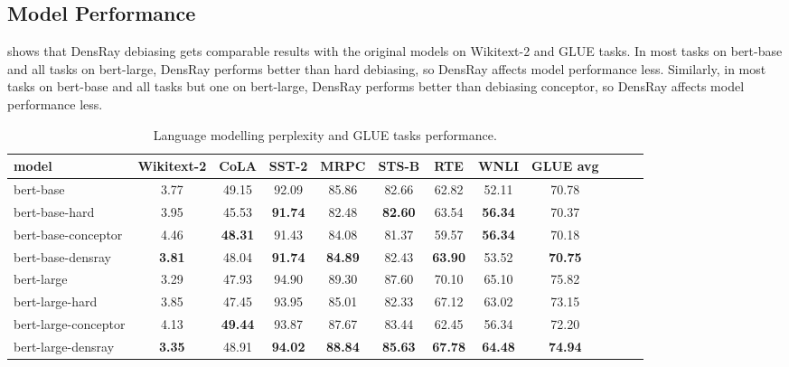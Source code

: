 \subsection{Model Performance}
 shows that DensRay debiasing gets comparable results with
the original models on Wikitext-2 and GLUE tasks.
In most tasks on bert-base and all tasks on bert-large, DensRay performs better than hard debiasing, so DensRay affects model performance less.
Similarly, in most tasks on bert-base and all tasks but one
on bert-large, DensRay performs better than debiasing conceptor, so DensRay affects model performance less.
\begin{table}[h]
\centering
\footnotesize
\begin{tabular}{l||c|cccccccccc}
model & Wikitext-2&CoLA &SST-2&MRPC&STS-B&RTE&WNLI&GLUE avg\\
\hline\hline
		bert-base &3.77&49.15&92.09&85.86&82.66&62.82&52.11&70.78\\
bert-base-hard &3.95&45.53&\textbf{91.74}&82.48&\textbf{82.60}&63.54&\textbf{56.34}&70.37\\
bert-base-conceptor &4.46&\textbf{48.31}&91.43&84.08&81.37&59.57&\textbf{56.34}&70.18\\
bert-base-densray &\textbf{3.81}&48.04&\textbf{91.74}&\textbf{84.89}&82.43&\textbf{63.90}&53.52&\textbf{70.75}\\
\hline
bert-large &3.29& 47.93&94.90&89.30&87.60&70.10&65.10&75.82\\
bert-large-hard &3.85& 47.45&93.95&85.01&82.33&67.12&63.02&73.15\\
bert-large-conceptor &4.13&\textbf{49.44}&93.87&87.67&83.44&62.45&56.34&72.20\\
bert-large-densray &\textbf{3.35}& 48.91&\textbf{94.02}&\textbf{88.84}&\textbf{85.63}&\textbf{67.78}&\textbf{64.48}&\textbf{74.94}\\
\end{tabular}
\caption{
Language modelling perplexity and GLUE tasks
performance. }
\end{table}



